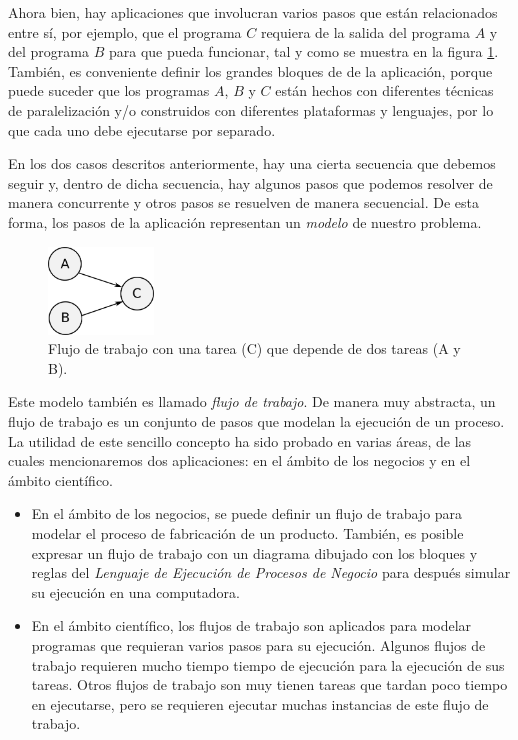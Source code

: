 Ahora bien, hay aplicaciones que involucran varios pasos que están relacionados entre sí, por ejemplo, que el programa $C$ requiera de la salida del programa $A$ y del programa $B$ para que pueda funcionar, tal y como se muestra en la figura \ref{fig:workflowABC}. También, es conveniente definir los grandes bloques de de la aplicación, porque puede suceder que los programas $A$, $B$ y $C$ están hechos con diferentes técnicas de paralelización y/o construidos con diferentes plataformas y lenguajes, por lo que cada uno debe ejecutarse por separado. 

En los dos casos descritos anteriormente, hay una cierta secuencia que debemos seguir y, dentro de dicha secuencia, hay algunos pasos que podemos resolver de manera concurrente y otros pasos se resuelven de manera secuencial. De esta forma, los pasos de la aplicación representan un \emph{modelo} de nuestro problema.

\begin{figure}
    \begin{center}
        \includegraphics[width=0.25\textwidth]{imagenes/workflowABC}
    \end{center}
    \caption{Flujo de trabajo con una tarea (C) que depende de dos tareas (A y B).}
    \label{fig:workflowABC}
\end{figure}

Este modelo también es llamado \emph{flujo de trabajo}. De manera muy abstracta, un flujo de trabajo es un conjunto de pasos que modelan la ejecución de un proceso. La utilidad de este sencillo concepto ha sido probado en varias áreas, de las cuales mencionaremos dos aplicaciones: en el ámbito de los negocios y en el ámbito científico. 

\begin{itemize}
\item{En el ámbito de los negocios, se puede definir un flujo de trabajo para modelar el proceso de fabricación de un producto. También, es posible expresar un flujo de trabajo con un diagrama dibujado con los bloques y reglas del \emph{Lenguaje de Ejecución de Procesos de Negocio} para después simular su ejecución en una computadora.}

\item{En el ámbito científico, los flujos de trabajo son aplicados para modelar programas que requieran varios pasos para su ejecución. Algunos flujos de trabajo requieren mucho tiempo tiempo de ejecución para la ejecución de sus tareas. Otros flujos de trabajo son muy tienen tareas que tardan poco tiempo en ejecutarse, pero se requieren ejecutar muchas instancias de este flujo de trabajo.}
\end{itemize}

